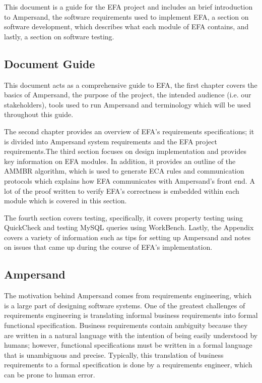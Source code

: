 \documentclass[journal,12pt,onecolumn,draftclsnofoot]{article}
\let\Oldsubsection\subsection
\renewcommand{\subsection}{\FloatBarrier\Oldsubsection}
\begin{document}
This document is a guide for the EFA project and includes an brief 
introduction 
to Ampersand, the software requirements used to implement EFA, a section on 
software development, which describes what each module of EFA contains, and 
lastly, a section on software testing.

\subsection{Document Guide}

This document acts as a comprehensive guide to EFA, the first chapter covers 
the basics of Ampersand, the purpose of the project, the intended audience 
(i.e. our stakeholders), tools used to run Ampersand and terminology which will 
be used throughout this guide. 

The second chapter provides an overview of EFA's requirements specifications; 
it is divided into Ampersand system requirements and the EFA project 
requirements.The third section focuses on design implementation and provides 
key information 
on EFA modules. In addition, it provides an outline of the AMMBR algorithm, 
which is used to generate ECA rules and communication protocols which explains 
how EFA communicates with Ampersand's front end. A lot of the proof written to 
verify EFA's correctness is embedded within each module which is covered in 
this section. 

The fourth section covers testing, specifically, it covers property testing 
using QuickCheck and testing MySQL queries using WorkBench. Lastly, the 
Appendix 
covers a variety of information such as tips for setting up 
Ampersand and notes on issues that came up during the course of EFA's 
implementation. 

\subsection{Ampersand}

\indent
The motivation behind Ampersand comes from requirements engineering, which is a 
large part of designing software systems. One of the greatest challenges of 
requirements engineering is translating informal business requirements into 
formal functional specification. Business requirements contain ambiguity 
because they are written in a natural language with the intention of being 
easily understood by humans; however,
functional specifications must be written in a formal language that is 
unambiguous and precise. Typically, this translation of business requirements 
to a formal specification is done by a requirements
engineer, which can be prone to human error.
\end{document}
